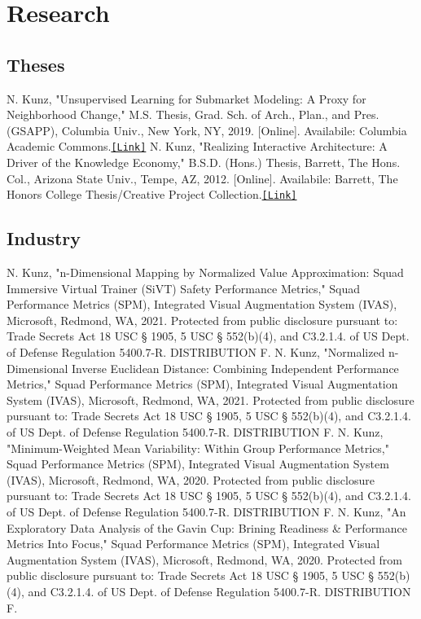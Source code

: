 \documentclass{article}
\begin{document}
    \section*{Research}
    \subsection*{Theses}
        N. Kunz, "Unsupervised Learning for Submarket Modeling: A Proxy for Neighborhood Change," M.S. Thesis, Grad. Sch. of Arch., Plan., and Pres. (GSAPP), Columbia Univ., New York, NY, 2019. [Online]. Availabile: Columbia Academic Commons.\space\href{https://doi.org/10.7916/d8-rj87-yx32}{\texttt{[Link]}}\newline\newline
        N. Kunz, "Realizing Interactive Architecture: A Driver of the Knowledge Economy," B.S.D. (Hons.) Thesis, Barrett, The Hons. Col., Arizona State Univ., Tempe, AZ, 2012. [Online]. Availabile: Barrett, The Honors College Thesis/Creative Project Collection.\space\href{https://repository.asu.edu/collections/130}{\texttt{[Link]}}
    \subsection*{Industry}
        N. Kunz, "n-Dimensional Mapping by Normalized Value Approximation: Squad Immersive Virtual Trainer (SiVT) Safety Performance Metrics," Squad Performance Metrics (SPM), Integrated Visual Augmentation System (IVAS), Microsoft, Redmond, WA, 2021. Protected from public disclosure pursuant to: Trade Secrets Act 18 USC § 1905, 5 USC § 552(b)(4), and C3.2.1.4. of US Dept. of Defense Regulation 5400.7-R. DISTRIBUTION F.\newline\newline
        N. Kunz, "Normalized n-Dimensional Inverse Euclidean Distance: Combining Independent Performance Metrics," Squad Performance Metrics (SPM), Integrated Visual Augmentation System (IVAS), Microsoft, Redmond, WA, 2021. Protected from public disclosure pursuant to: Trade Secrets Act 18 USC § 1905, 5 USC § 552(b)(4), and C3.2.1.4. of US Dept. of Defense Regulation 5400.7-R. DISTRIBUTION F.\newline\newline
        N. Kunz, "Minimum-Weighted Mean Variability: Within Group Performance Metrics," Squad Performance Metrics (SPM), Integrated Visual Augmentation System (IVAS), Microsoft, Redmond, WA, 2020. Protected from public disclosure pursuant to: Trade Secrets Act 18 USC § 1905, 5 USC § 552(b)(4), and C3.2.1.4. of US Dept. of Defense Regulation 5400.7-R. DISTRIBUTION F.\newline\newline
        N. Kunz, "An Exploratory Data Analysis of the Gavin Cup: Brining Readiness \& Performance Metrics Into Focus," Squad Performance Metrics (SPM), Integrated Visual Augmentation System (IVAS), Microsoft, Redmond, WA, 2020. Protected from public disclosure pursuant to: Trade Secrets Act 18 USC § 1905, 5 USC § 552(b)(4), and C3.2.1.4. of US Dept. of Defense Regulation 5400.7-R. DISTRIBUTION F.
\newpage
\end{document}

